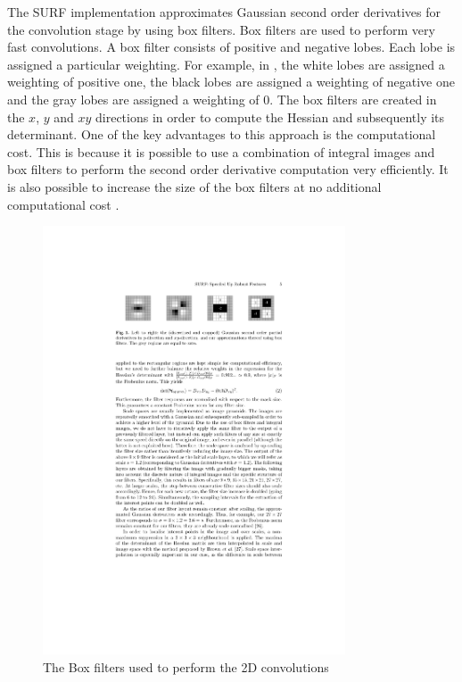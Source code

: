\documentclass{article}
\begin{document}
The SURF implementation approximates Gaussian second order derivatives for the convolution stage by using box filters. Box filters are used to perform very fast convolutions. A box filter consists of positive and negative lobes. Each lobe is assigned a particular weighting. For example, in  \cite{Bay2008}, the white lobes are assigned a weighting of positive one, the black lobes are assigned a weighting of negative one and the gray lobes are assigned a weighting of 0. The box filters are created in the $x$, $y$ and $xy$ directions in order to compute the Hessian and subsequently its determinant. One of the key advantages to this approach is the computational cost. This is because it is possible to use a combination of integral images and box filters to perform the second order derivative computation very efficiently. It is also possible to increase the size of the box filters at no additional computational cost \cite{Bay2008}.\\

\begin{figure}[h!] 
  \centering
    \includegraphics[width=0.8\textwidth]{../Drawings/methods/SURF2D_BoxFilters.pdf}
    \caption{The Box filters used to perform the 2D convolutions}
    \label{fig:boxFilters}
\end{figure}
\end{document}
